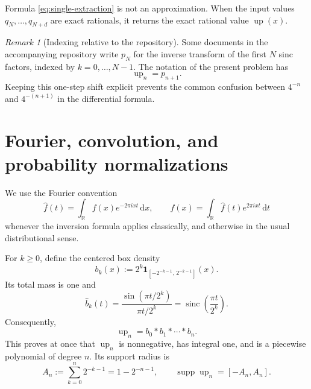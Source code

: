 \documentclass[11pt,oneside]{article}
\theoremstyle{definition}
\theoremstyle{remark}
\newtheorem{remark}[theorem]{Remark}
\newcommand{\R}{\mathbb R}
\newcommand{\up}{\operatorname{up}}
\newcommand{\sinc}{\operatorname{sinc}}
\newcommand{\supp}{\operatorname{supp}}
\newcommand{\dd}{\,\mathrm d}
\begin{document}
Formula \eqref{eq:single-extraction} is not an approximation.  When the input
values \(q_{N},\ldots,q_{N+d}\) are exact rationals, it returns the exact
rational value \(\up(x)\).

\begin{remark}[Indexing relative to the repository]
Some documents in the accompanying repository write \(p_N\) for the inverse
transform of the first \(N\) sinc factors, indexed by \(k=0,\ldots,N-1\).
The notation of the present problem has
\begin{equation}\label{eq:index-shift}
 \up_n=p_{n+1}.
\end{equation}
Keeping this one-step shift explicit prevents the common confusion between
\(4^{-n}\) and \(4^{-(n+1)}\) in the differential formula.
\end{remark}

\section{Fourier, convolution, and probability normalizations}

We use the Fourier convention
\begin{equation}\label{eq:fourier-convention}
 \widehat f(t)=\int_{\R}f(x)e^{-2\pi ixt}\dd x,
 \qquad
 f(x)=\int_{\R}\widehat f(t)e^{2\pi ixt}\dd t
\end{equation}
whenever the inversion formula applies classically, and otherwise in the
usual distributional sense.

For \(k\ge0\), define the centered box density
\begin{equation}\label{eq:box-density}
 b_k(x):=2^k\mathbf 1_{[-2^{-k-1},\,2^{-k-1}]}(x).
\end{equation}
Its total mass is one and
\begin{equation}\label{eq:box-transform}
 \widehat b_k(t)
 =\frac{\sin(\pi t/2^k)}{\pi t/2^k}
 =\sinc\!\left(\frac{\pi t}{2^k}\right).
\end{equation}
Consequently,
\begin{equation}\label{eq:finite-convolution}
 \up_n=b_0*b_1*\cdots*b_n.
\end{equation}
This proves at once that \(\up_n\) is nonnegative, has integral one, and is a
piecewise polynomial of degree \(n\).  Its support radius is
\begin{equation}\label{eq:An}
 A_n:=\sum_{k=0}^{n}2^{-k-1}=1-2^{-n-1},
 \qquad \supp\up_n=[-A_n,A_n].
\end{equation}
\end{document}
